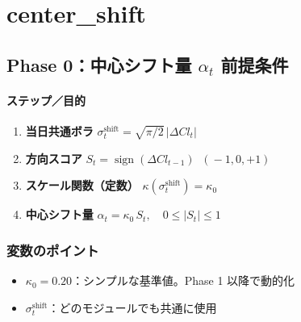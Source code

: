 
\section*{center\_shift}\nopagebreak[4]

\subsection*{Phase 0：中心シフト量 $\alpha_t$ 前提条件}\nopagebreak[4]
\paragraph{ステップ／目的}
\begin{flushleft}
\begin{enumerate}
  \item \textbf{当日共通ボラ}\;
        \(
          \sigma_t^{\text{shift}}
          =\sqrt{\pi/2}\,|\Delta Cl_t|
        \)
  \item \textbf{方向スコア}\;
        \( S_t=\operatorname{sign}(\Delta Cl_{t-1})\;\;(\!-1,0,+1) \)
  \item \textbf{スケール関数（定数）}\;
        \(\kappa(\sigma_t^{\text{shift}})=\kappa_0\)
  \item \textbf{中心シフト量}\;
        \(\alpha_t=\kappa_0\,S_t,\quad 0\le|S_t|\le1\)
\end{enumerate}
\end{flushleft}

\subsubsection*{変数のポイント}
\begin{flushleft}
\begin{itemize}
  \item \(\kappa_0=0.20\)：シンプルな基準値。Phase 1 以降で動的化
  \item \(\sigma_t^{\text{shift}}\)：どのモジュールでも共通に使用
\end{itemize}
\end{flushleft}

